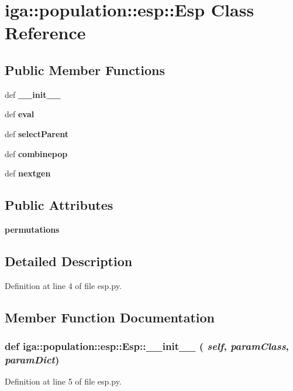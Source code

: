 \section{iga::population::esp::Esp Class Reference}
\label{classiga_1_1population_1_1esp_1_1Esp}
\subsection*{Public Member Functions}
\begin{CompactItemize}
\item 
def {\bf \_\-\_\-init\_\-\_\-}
\item 
def {\bf eval}
\item 
def {\bf selectParent}
\item 
def {\bf combinepop}
\item 
def {\bf nextgen}
\end{CompactItemize}
\subsection*{Public Attributes}
\begin{CompactItemize}
\item 
{\bf permutations}
\end{CompactItemize}


\subsection{Detailed Description}


Definition at line 4 of file esp.py.

\subsection{Member Function Documentation}
\subsubsection{\setlength{\rightskip}{0pt plus 5cm}def iga::population::esp::Esp::\_\-\_\-init\_\-\_\- ( {\em self},  {\em paramClass},  {\em paramDict})}\label{classiga_1_1population_1_1esp_1_1Esp_2bb94622c73ecdba85aa4205f362dffa}




Definition at line 5 of file esp.py.
